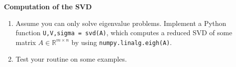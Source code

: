 \textbf{Computation of the SVD}
\begin{enumerate}
    \item Assume you can only solve eigenvalue problems. Implement a Python function \texttt{U,V,sigma = svd(A)}, which computes a reduced SVD of some matrix $A \in \mathbb{R}^{m \times n}$ by using \texttt{numpy.linalg.eigh(A)}.
    \item Test your routine on some examples.
\end{enumerate}

